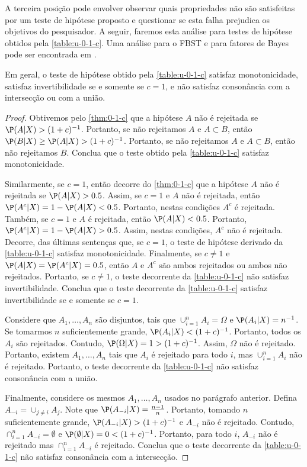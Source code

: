 A terceira posição pode envolver observar quais 
propriedades não são satisfeitas por um 
teste de hipótese proposto e questionar se 
esta falha prejudica os objetivos do pesquisador.
A seguir, faremos esta análise para 
testes de hipótese obtidos pela \cref{table:u-0-1-c}.
Uma análise para o FBST e para 
fatores de Bayes pode ser encontrada em
\citet{Izbicki2015}.

\begin{theorem}
 \label{thm:0-1-c-desiderata}
 Em geral, o teste de hipótese obtido pela
 \cref{table:u-0-1-c} satisfaz monotonicidade,
 satisfaz invertibilidade se e somente se $c=1$, e
 não satisfaz consonância com a intersecção ou
 com a união.
\end{theorem}

\begin{proof}
 Obtivemos pelo \cref{thm:0-1-c} que
 a hipótese $A$ não é rejeitada se 
 $\P(A|X) > (1+c)^{-1}$.
 Portanto, se não rejeitamos $A$ e 
 $A \subset B$, então
 $\P(B|X) \geq \P(A|X) > (1+c)^{-1}$.
 Portanto, se não rejeitamos $A$ e 
 $A \subset B$, então 
 não rejeitamos $B$.
 Conclua que o teste obtido pela
 \cref{table:u-0-1-c} satisfaz monotonicidade.
 
 Similarmente, se $c=1$, então decorre
 do \cref{thm:0-1-c} que
 a hipótese $A$ não é rejeitada se $\P(A|X) > 0.5$.
 Assim, se $c=1$ e $A$ não é rejeitada,
 então $\P(A^{c}|X) = 1-\P(A|X) < 0.5$.
 Portanto, nestas condições $A^{c}$ é rejeitada.
 Também, se $c=1$ e $A$ é rejeitada, 
 então $\P(A|X) < 0.5$.
 Portanto, $\P(A^{c}|X) = 1-\P(A|X) > 0.5$.
 Assim, nestas condições, $A^{c}$ não é rejeitada.
 Decorre, das últimas sentenças que, se $c=1$,
 o teste de hipótese derivado da 
 \cref{table:u-0-1-c} satisfaz monotonicidade.
 Finalmente, se $c \neq 1$
 e $\P(A|X) = \P(A^{c}|X) = 0.5$,
 então $A$ e $A^{c}$ são ambos rejeitados
 ou ambos não rejeitados.
 Portanto, se $c \neq 1$,
 o teste decorrente da \cref{table:u-0-1-c}
 não satisfaz invertibilidade.
 Conclua que o teste decorrente da 
 \cref{table:u-0-1-c} satisfaz invertibilidade 
 se e somente se $c=1$.

 Considere que $A_{1},\ldots,A_{n}$ são disjuntos,
 tais que $\cup_{i=1}^{n}{A_{i}} = \Omega$ e
 $\P(A_{i}|X) = n^{-1}$.
 Se tomarmos $n$ suficientemente grande,
 $\P(A_{i}|X) < (1+c)^{-1}$.
 Portanto, todos os $A_{i}$ são rejeitados.
 Contudo, $\P(\Omega|X) = 1 > (1+c)^{-1}$.
 Assim, $\Omega$ não é rejeitado.
 Portanto, existem $A_{1},\ldots,A_{n}$
 tais que $A_{i}$ é rejeitado para todo $i$,
 mas $\cup_{i=1}^{n}{A_{i}}$ não é rejeitado.
 Portanto, o teste decorrente da 
 \cref{table:u-0-1-c} não satisfaz 
 consonância com a união.

 Finalmente, considere os mesmos 
 $A_{1},\ldots,A_{n}$ usados no parágrafo anterior.
 Defina $A_{-i} = \cup_{j\neq i}{A_{j}}$.
 Note que $\P(A_{-i}|X) = \frac{n-1}{n}$.
 Portanto, tomando $n$ suficientemente grande,
 $\P(A_{-i}|X) > (1+c)^{-1}$ e
 $A_{-i}$ não é rejeitado.
 Contudo, $\cap_{i=1}^{n}{A_{-i}}=\emptyset$
 e $\P(\emptyset|X) = 0 < (1+c)^{-1}$.
 Portanto, para todo $i$,
 $A_{-i}$ não é rejeitado mas
 $\cap_{i=1}^{n}{A_{-i}}$ é rejeitado.
 Conclua que o teste decorrente da 
 \cref{table:u-0-1-c} não satisfaz 
 consonância com a intersecção.
\end{proof}


